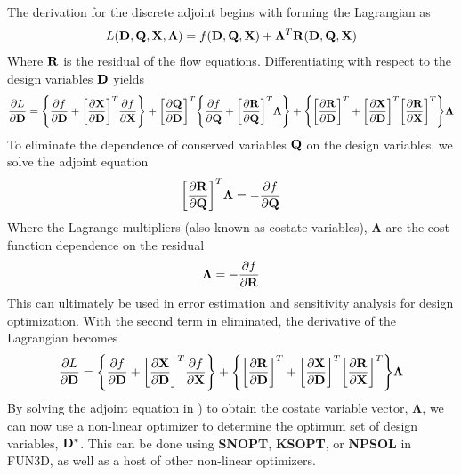 The derivation for the discrete adjoint begins with forming the Lagrangian as
\begin{equation}
  L(\mathbf D,\mathbf Q,\mathbf X,\mathbf{\Lambda})=f(\mathbf D,\mathbf Q,\mathbf X)
  +\mathbf{\Lambda}^T\mathbf R(\mathbf D,\mathbf Q,\mathbf X)
\end{equation}
Where $\mathbf R$ is the residual of the flow equations.  Differentiating with respect
to the design variables $\mathbf D$ yields
\begin{equation}
  \frac{\partial L}{\partial \mathbf D} = 
  \Bigg\{\frac{\partial f}{\partial \mathbf D}+\bigg[\frac{\partial \mathbf X}{\partial \mathbf D}\bigg]^T \frac{\partial f}{\partial \mathbf X}\Bigg\} 
  + \bigg[\frac{\partial \mathbf Q}{\partial \mathbf D}\bigg]^T
  \Bigg\{\frac{\partial f}{\partial \mathbf Q}+\bigg[\frac{\partial \mathbf R}{\partial \mathbf Q}\bigg]^T \mathbf{\Lambda}\Bigg\}
  +\Bigg\{\bigg[\frac{\partial \mathbf R}{\partial \mathbf D}\bigg]^T
  +\bigg[\frac{\partial \mathbf X}{\partial \mathbf D}\bigg]^T\bigg[\frac{\partial \mathbf R}{\partial \mathbf X}\bigg]^T\Bigg\}\mathbf{\Lambda}
  \label{dL}
\end{equation}
To eliminate the dependence of conserved variables $\mathbf Q$ on the design
variables, we solve the adjoint equation
\begin{equation}
  \bigg[\frac{\partial \mathbf R}{\partial \mathbf Q}\bigg]^T\mathbf{\Lambda} = -\frac{\partial f}{\partial \mathbf Q}
  \label{adjoint-main}
\end{equation}
Where the Lagrange multipliers (also known as costate variables),
$\mathbf{\Lambda}$ are the cost function dependence on the residual
\begin{equation}
  \mathbf{\Lambda}=-\frac{\partial f}{\partial \mathbf R}
\end{equation}
This can ultimately be used in error estimation and sensitivity analysis for
design optimization.  With the second term in  eliminated, the
derivative of the Lagrangian becomes
\begin{equation}
  \frac{\partial L}{\partial \mathbf D}=
  \Bigg\{\frac{\partial f}{\partial \mathbf D}+\bigg[\frac{\partial \mathbf X}{\partial \mathbf D}\bigg]^T \frac{\partial f}{\partial \mathbf X}\Bigg\}
  +\Bigg\{\bigg[\frac{\partial \mathbf R}{\partial \mathbf D}\bigg]^T
  +\bigg[\frac{\partial \mathbf X}{\partial \mathbf D}\bigg]^T\bigg[\frac{\partial \mathbf R}{\partial \mathbf X}\bigg]^T\Bigg\}\mathbf{\Lambda}
  \label{obj-function}
\end{equation}
By solving the adjoint equation in ) to obtain the costate
variable vector, $\mathbf{\Lambda}$, we can now use a non-linear optimizer to
determine the optimum set of design variables, $\mathbf D^*$. This can be done using
{\bf SNOPT\cite{snopt-manual}}, {\bf KSOPT\cite{KSOPT}}, or {\bf
  NPSOL\cite{npsol-manual}} in FUN3D, as well as a host of other non-linear
  optimizers.

